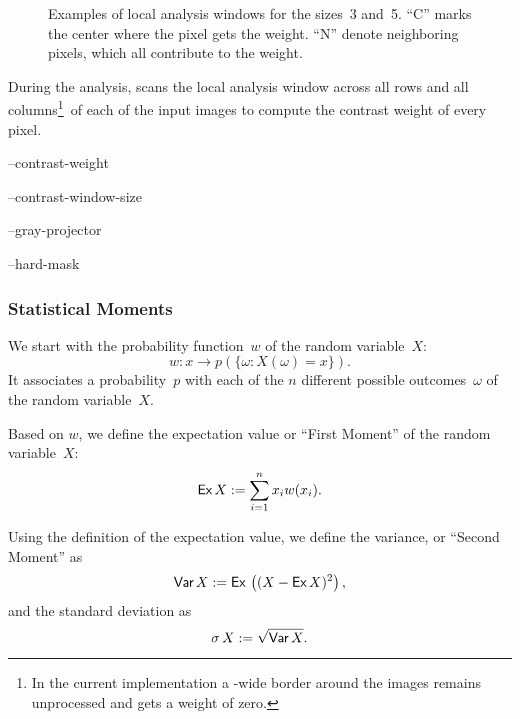 \begin{figure}
  \begin{maxipage}
    \centering
  \end{maxipage}

  \caption[Local analysis window]{\label{fig:local-analysis-window}Examples of local analysis
    windows for the sizes~3 and~5.  ``\textsf{C}'' marks the center where the pixel gets the
    weight.  ``\textsf{N}'' denote neighboring pixels, which all contribute to the weight.}
\end{figure}


During the analysis, \App{} scans the local analysis window across all rows and all
columns\footnote{In the current implementation a -wide
  border around the images remains unprocessed and gets a weight of zero.}\ of each of the input
images to compute the contrast weight of every pixel.

\begin{optionsummary}
\item[--contrast-weight] \sectionName~
\item[--contrast-window-size] \sectionName~
\item[--gray-projector] \sectionName~
\item[--hard-mask] \sectionName~
\end{optionsummary}


\subsubsection[Statistical Moments]{\label{sec:statistical-moments}%
  Statistical Moments}

%
%
We start with the probability function~$w$ of the random variable~$X$:
\[
    w: x \rightarrow p(\{\omega: X(\omega) = x\}).
\]
\noindent It associates a probability~$p$ with each of the $n$ different possible
outcomes~$\omega$ of the random variable~$X$.

%
%
%
Based on $w$, we define the expectation value or ``First Moment'' of the random variable~$X$:
\[
    \textsf{Ex}\, X := \sum_{i = 1}^n x_i w(x_i).
\]

%
%
%
Using the definition of the expectation value, we define the
variance, or ``Second Moment'' as
\[
    \textsf{Var}\, X := \mbox{\textsf{Ex}\,}\left( (X - \textsf{Ex}\, X)^2 \right),
\]
%
\noindent and the standard deviation as
\[
    \sigma \, X := \sqrt{\textsf{Var}\, X}.
\]

